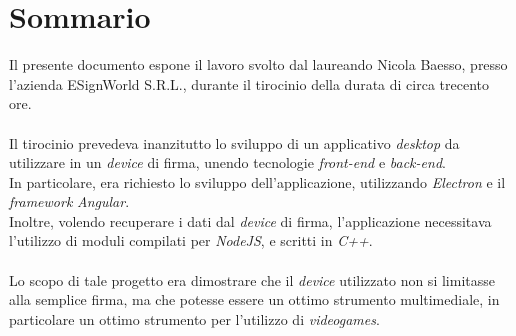 \cleardoublepage
{}
{}
\begingroup
\let\clearpage\relax
\let\cleardoublepage\relax
\let\cleardoublepage\relax

\chapter*{Sommario}

Il presente documento espone il lavoro svolto dal laureando Nicola Baesso, presso l'azienda ESignWorld S.R.L., durante il tirocinio della durata di circa trecento ore.\\\\
Il tirocinio prevedeva inanzitutto lo sviluppo di un applicativo \emph{desktop} da utilizzare in un \emph{device} di firma, unendo tecnologie \emph{front-end} e \emph{back-end}.\\
In particolare, era richiesto lo sviluppo dell'applicazione, utilizzando \emph{Electron} e il \emph{framework} \emph{Angular}.\\
Inoltre, volendo recuperare i dati dal \emph{device} di firma, l'applicazione necessitava l'utilizzo di moduli compilati per \emph{NodeJS}, e scritti in \emph{C++}.\\\\
Lo scopo di tale progetto era dimostrare che il \emph{device} utilizzato non si limitasse alla semplice firma, ma che potesse essere un ottimo strumento multimediale, in particolare un ottimo strumento per l'utilizzo di \emph{videogames}.\\




\endgroup

\vfill
